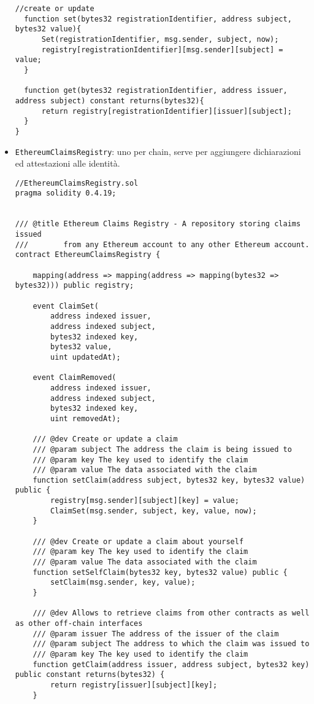 \begin{itemize}
\begin{lstlisting}[language=Solidity]
  //create or update
  function set(bytes32 registrationIdentifier, address subject, bytes32 value){
      Set(registrationIdentifier, msg.sender, subject, now);
      registry[registrationIdentifier][msg.sender][subject] = value;
  }

  function get(bytes32 registrationIdentifier, address issuer, address subject) constant returns(bytes32){
      return registry[registrationIdentifier][issuer][subject];
  }
}
  \end{lstlisting}

  \item \texttt{EthereumClaimsRegistry}: uno per chain, serve per aggiungere dichiarazioni ed attestazioni alle identità.
  
  \begin{lstlisting}[language=Solidity]
//EthereumClaimsRegistry.sol
pragma solidity 0.4.19;


/// @title Ethereum Claims Registry - A repository storing claims issued
///        from any Ethereum account to any other Ethereum account.
contract EthereumClaimsRegistry {

    mapping(address => mapping(address => mapping(bytes32 => bytes32))) public registry;

    event ClaimSet(
        address indexed issuer,
        address indexed subject,
        bytes32 indexed key,
        bytes32 value,
        uint updatedAt);

    event ClaimRemoved(
        address indexed issuer,
        address indexed subject,
        bytes32 indexed key,
        uint removedAt);

    /// @dev Create or update a claim
    /// @param subject The address the claim is being issued to
    /// @param key The key used to identify the claim
    /// @param value The data associated with the claim
    function setClaim(address subject, bytes32 key, bytes32 value) public {
        registry[msg.sender][subject][key] = value;
        ClaimSet(msg.sender, subject, key, value, now);
    }

    /// @dev Create or update a claim about yourself
    /// @param key The key used to identify the claim
    /// @param value The data associated with the claim
    function setSelfClaim(bytes32 key, bytes32 value) public {
        setClaim(msg.sender, key, value);
    }

    /// @dev Allows to retrieve claims from other contracts as well as other off-chain interfaces
    /// @param issuer The address of the issuer of the claim
    /// @param subject The address to which the claim was issued to
    /// @param key The key used to identify the claim
    function getClaim(address issuer, address subject, bytes32 key) public constant returns(bytes32) {
        return registry[issuer][subject][key];
    }


\end{lstlisting}
\end{itemize}

